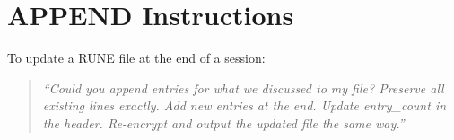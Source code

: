 \documentclass[11pt,a4paper]{article}
\begin{document}
\section{APPEND Instructions}
\label{app:append}

To update a RUNE file at the end of a session:

\begin{quote}
\textit{``Could you append entries for what we discussed to my file? Preserve all existing lines exactly. Add new entries at the end. Update entry\_count in the header. Re-encrypt and output the updated file the same way.''}
\end{quote}
\end{document}
